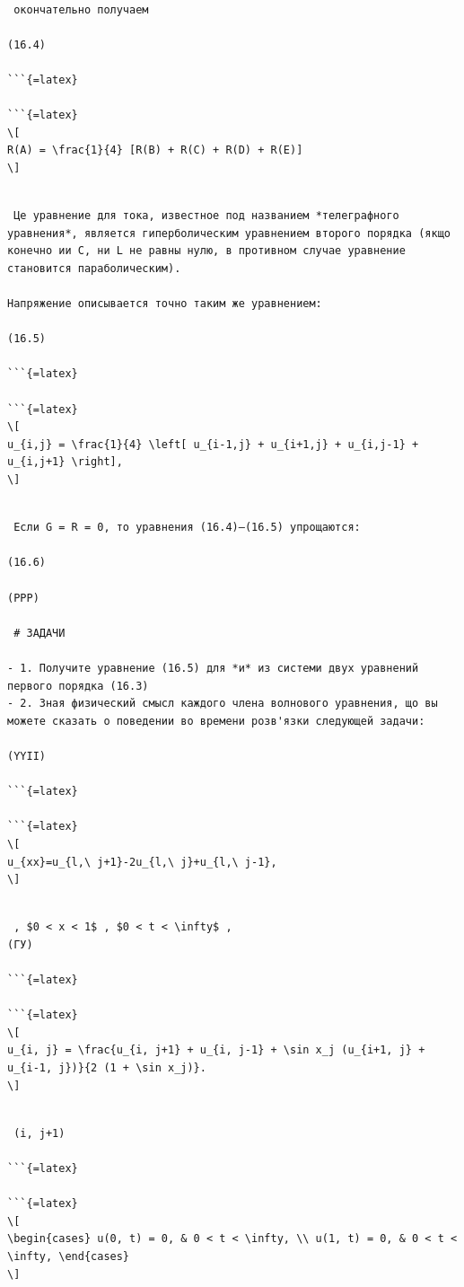 \documentclass[
  ukrainian,
]{article}
\begin{document}
\begin{verbatim}

 окончательно получаем

(16.4)

```{=latex}

```{=latex}
\[
R(A) = \frac{1}{4} [R(B) + R(C) + R(D) + R(E)]
\]
\end{verbatim}

\begin{verbatim}

 Це уравнение для тока, известное под названием *телеграфного уравнения*, является гиперболическим уравнением второго порядка (якщо конечно ии C, ни L не равны нулю, в противном случае уравнение становится параболическим).

Напряжение описывается точно таким же уравнением:

(16.5)

```{=latex}

```{=latex}
\[
u_{i,j} = \frac{1}{4} \left[ u_{i-1,j} + u_{i+1,j} + u_{i,j-1} + u_{i,j+1} \right],
\]
\end{verbatim}

\begin{verbatim}

 Если G = R = 0, то уравнения (16.4)—(16.5) упрощаются:

(16.6)

(PPP)

 # ЗАДАЧИ

- 1. Получите уравнение (16.5) для *и* из системи двух уравнений первого порядка (16.3)
- 2. Зная физический смысл каждого члена волнового уравнения, що вы можете сказать о поведении во времени розв'язки следующей задачи:

(YYII)

```{=latex}

```{=latex}
\[
u_{xx}=u_{l,\ j+1}-2u_{l,\ j}+u_{l,\ j-1},
\]
\end{verbatim}

\begin{verbatim}

 , $0 < x < 1$ , $0 < t < \infty$ , 
(ГУ)

```{=latex}

```{=latex}
\[
u_{i, j} = \frac{u_{i, j+1} + u_{i, j-1} + \sin x_j (u_{i+1, j} + u_{i-1, j})}{2 (1 + \sin x_j)}.
\]
\end{verbatim}

\begin{verbatim}

 (i, j+1)

```{=latex}

```{=latex}
\[
\begin{cases} u(0, t) = 0, & 0 < t < \infty, \\ u(1, t) = 0, & 0 < t < \infty, \end{cases}
\]
\end{verbatim}
\end{document}
